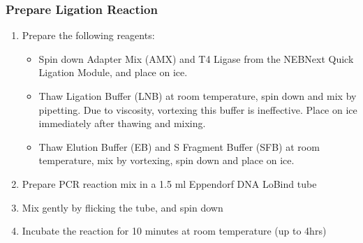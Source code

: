 \subsubsection{Prepare Ligation Reaction}
\begin{enumerate}
	\item Prepare the following reagents:
	\begin{itemize}
		\item Spin down Adapter Mix (AMX) and T4 Ligase from the NEBNext Quick Ligation Module, and place on ice.
		\item Thaw Ligation Buffer (LNB) at room temperature, spin down and mix by pipetting. Due to viscosity, vortexing this buffer is ineffective. Place on ice immediately after thawing and mixing.
		\item Thaw Elution Buffer (EB) and S Fragment Buffer (SFB) at room temperature, mix by vortexing, spin down and place on ice.
	\end{itemize}
	\item Prepare PCR reaction mix in a 1.5 ml Eppendorf DNA LoBind tube
	\item Mix gently by flicking the tube, and spin down 
	\item Incubate the reaction for 10 minutes at room temperature (up to 4hrs)
\end{enumerate}

